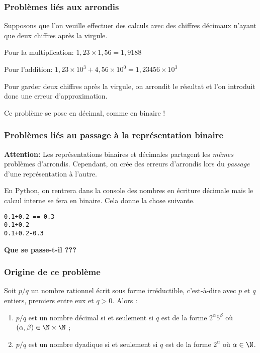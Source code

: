 \subsubsection{Problèmes liés aux arrondis}
Supposons que l'on veuille effectuer des calculs avec des chiffres décimaux n'ayant que deux chiffres après la virgule.
\begin{exemple}
Pour la multiplication:
$1,23\times 1,56 = 1,9188$
\end{exemple}
\begin{exemple}
Pour l'addition:
$1,23\times 10^{3} + 4,56\times 10^{0} = 1,23456\times 10^{3}$
\end{exemple}
Pour garder deux chiffres après la virgule, on arrondit le résultat et l'on introduit donc une erreur d'approximation.

Ce problème se pose en décimal, comme en binaire !

\subsubsection{Problèmes liés au passage à la représentation binaire}

\textbf{Attention:}
Les représentations binaires et décimales partagent les \emph{mêmes} problèmes d'arrondis. 
Cependant, on crée des erreurs d'arrondis lors du \emph{passage} d'une représentation à l'autre.
\begin{exemple}
En Python, on rentrera dans la console des nombres en écriture décimale mais le calcul interne se fera en binaire. Cela donne la chose suivante.
\begin{lstlisting}
0.1+0.2 == 0.3
0.1+0.2
0.1+0.2-0.3
\end{lstlisting}
\end{exemple}


\begin{center}
\textbf{Que se passe-t-il ???}
\end{center}

\subsubsection{Origine de ce problème}

\begin{theorem}
Soit $p/q$ un nombre rationnel écrit sous forme irréductible, c'est-à-dire avec $p$
et $q$ entiers, premiers entre eux et $q>0$. Alors :
\begin{enumerate}
\item $p/q$ est un nombre décimal si et seulement
  si $q$ est de la forme $2^{\alpha}5^{\beta}$ où $(\alpha,\beta)\in
  \N\times \N$ ;
\item $p/q$ est un nombre dyadique si et seulement
  si $q$ est de la forme $2^{\alpha}$ où $\alpha\in \N$.
\end{enumerate}
\end{theorem}

